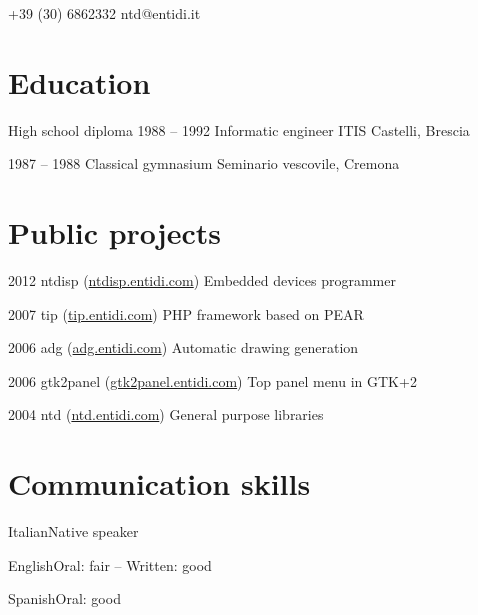 \documentclass{tccv}
\begin{document}
    {+39 (30) 6862332}
    {ntd@entidi.it}

\section{Education}

\begin{yearlist}

\item[High school diploma]{1988 -- 1992}
     {Informatic engineer}
     {ITIS Castelli, Brescia}

\item{1987 -- 1988}
     {Classical gymnasium}
     {Seminario vescovile, Cremona}

\end{yearlist}

\section{Public projects}

\begin{yearlist}

\item{2012}
     {ntdisp (\href{http://ntdisp.entidi.com/}{ntdisp.entidi.com})}
     {Embedded devices programmer}

\item{2007}
     {tip (\href{http://tip.entidi.com/}{tip.entidi.com})}
     {PHP framework based on PEAR}

\item{2006}
     {adg (\href{http://adg.entidi.com/}{adg.entidi.com})}
     {Automatic drawing generation}

\item{2006}
     {gtk2panel (\href{http://gtk2panel.entidi.com/}{gtk2panel.entidi.com})}
     {Top panel menu in GTK+2}

\item{2004}
     {ntd (\href{http://ntd.entidi.com/}{ntd.entidi.com})}
     {General purpose libraries}

\end{yearlist}

\section{Communication skills}

\begin{factlist}
\item{Italian}{Native speaker}
\item{English}{Oral: fair -- Written: good}
\item{Spanish}{Oral: good}
\end{factlist}
\end{document}
